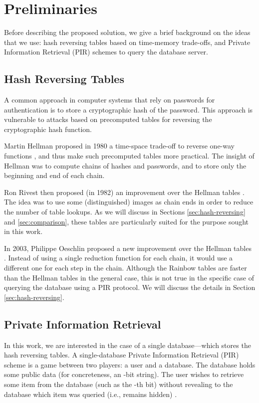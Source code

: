 \documentclass{llncs}
\newcommand{\ie}{i.e.}
\begin{document}
\section{Preliminaries} \label{sec:preliminaries}

Before describing the proposed solution, we give
a brief background on the ideas that we use: 
hash reversing tables based on time-memory trade-offs,
and Private Information Retrieval (PIR) schemes
to query the database server.



\subsection{Hash Reversing Tables}\label{sec:intro-hrt}

A common approach in computer systems that rely on passwords for authentication
is to store a cryptographic hash of the password. 
This approach is vulnerable to attacks based on precomputed tables for reversing 
the cryptographic hash function.

Martin Hellman proposed in 1980 a time-space
trade-off to reverse one-way functions \cite{paper:h-80}, 
and thus make such precomputed tables more practical.
The insight of Hellman was to compute chains
of hashes and passwords, and to store only the beginning
and end of each chain.

Ron Rivest then proposed (in 1982) an improvement over
the Hellman tables \cite{inbook:r-82}. The idea was
to use some (distinguished) images as chain ends in order to reduce the
number of table lookups.
As we will discuss in Sections \ref{sec:hash-reversing} and \ref{sec:comparison},
these tables are particularly suited for the purpose sought in this work.

In 2003, Philippe Oeschlin proposed a new improvement over the Hellman
tables \cite{paper:o-03}. Instead of using a single reduction function
for each chain, it would use a different one for each step in the
chain. Although the Rainbow tables are faster than the Hellman tables
in the general case, this is not true in the specific case of querying the database
using a PIR protocol.
We will discuss the details in Section \ref{sec:hash-reversing}.


\subsection{Private Information Retrieval} \label{sec:PIR}

In this work, we are interested in the case of a single database---which
stores the hash reversing tables.
A single-database Private Information Retrieval (PIR) scheme is a
game between two players: a user and a database. The database holds
some public data (for concreteness, an -bit string). The user
wishes to retrieve some item from the database (such as the -th
bit) without revealing to the database which item was queried (\ie,
 remains hidden) \cite{paper:pir_survey}.
\end{document}
